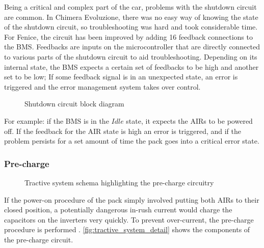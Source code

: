 Being a critical and complex part of the car, problems with the shutdown circuit are common. In Chimera Evoluzione, there was no easy way of knowing the state of the shutdown circuit, so troubleshooting was hard and took considerable time. For Fenice, the circuit has been improved by adding 16 feedback connections to the BMS. Feedbacks are inputs on the microcontroller that are directly connected to various parts of the shutdown circuit to aid troubleshooting. Depending on its internal state, the BMS expects a certain set of feedbacks to be high and another set to be low; If some feedback signal is in an unexpected state, an error is triggered and the error management system takes over control.
\begin{figure}[h]
    \centering
    \caption{Shutdown circuit block diagram \cite[EV 6.1.2]{fsg2020}}
    \label{fig:shutdown_circuit}
\end{figure}

For example: if the BMS is in the $Idle$ state, it expects the AIRs to be powered off. If the feedback for the AIR state is high an error is triggered, and if the problem persists for a set amount of time the pack goes into a critical error state.

\subsubsection{Pre-charge}
\begin{figure}[h]
    \centering
    
    \caption{Tractive system schema highlighting the pre-charge circuitry}
    \label{fig:tractive_system_detail}
\end{figure}
If the power-on procedure of the pack simply involved putting both AIRs to their closed position, a potentially dangerous in-rush current would charge the capacitors on the inverters very quickly. To prevent over-current, the pre-charge procedure is performed \cite{precharge}. \autoref{fig:tractive_system_detail} shows the components of the pre-charge circuit.


